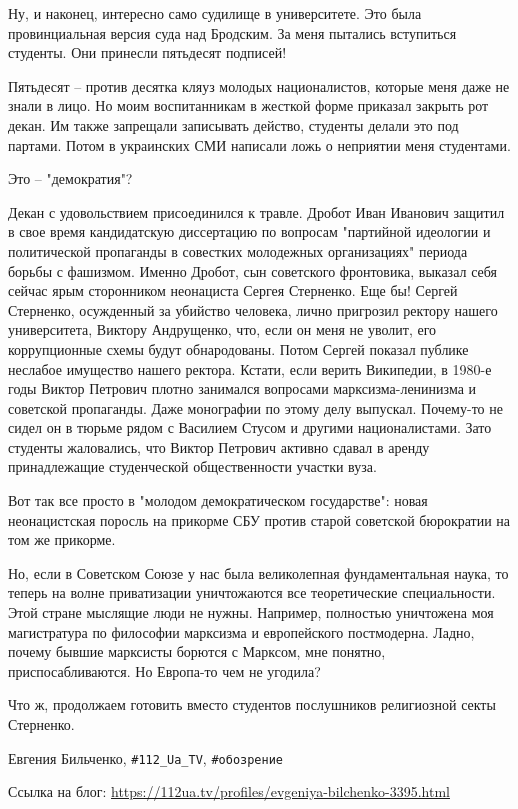 Ну, и наконец, интересно само судилище в университете. Это была провинциальная
версия суда над Бродским. За меня пытались вступиться студенты. Они принесли
пятьдесят подписей! 

Пятьдесят – против десятка кляуз молодых националистов, которые меня даже не
знали в лицо. Но моим воспитанникам в жесткой форме приказал закрыть рот декан.
Им также запрещали записывать действо, студенты делали это под партами. Потом в
украинских СМИ написали ложь о неприятии меня студентами.

Это – "демократия"?

Декан с удовольствием присоединился к травле. Дробот Иван Иванович защитил в
свое время кандидатскую диссертацию по вопросам "партийной идеологии и
политической пропаганды в совестких молодежных организациях" периода борьбы с
фашизмом. Именно Дробот, сын советского фронтовика, выказал себя сейчас ярым
сторонником неонациста Сергея Стерненко. Еще бы! Сергей Стерненко, осужденный
за убийство человека, лично пригрозил ректору нашего университета, Виктору
Андрущенко, что, если он меня не уволит, его коррупционные схемы будут
обнародованы. Потом Сергей показал публике неслабое имущество нашего ректора.
Кстати, если верить Википедии, в 1980-е годы Виктор Петрович плотно занимался
вопросами марксизма-ленинизма и советской пропаганды. Даже монографии по этому
делу выпускал. Почему-то не сидел он в тюрьме рядом с Василием Стусом и другими
националистами. Зато студенты жаловались, что Виктор Петрович активно сдавал в
аренду принадлежащие студенческой общественности участки вуза.

Вот так все просто в "молодом демократическом государстве": новая неонацистская
поросль на прикорме СБУ против старой советской бюрократии на том же прикорме.

Но, если в Советском Союзе у нас была великолепная фундаментальная наука, то
теперь на волне приватизации уничтожаются все теоретические специальности. Этой
стране мыслящие люди не нужны. Например, полностью уничтожена моя магистратура
по философии марксизма и европейского постмодерна. Ладно, почему бывшие
марксисты борются с Марксом, мне понятно, приспосабливаются. Но Европа-то чем
не угодила?

Что ж, продолжаем готовить вместо студентов послушников религиозной секты
Стерненко.

Евгения Бильченко, \verb|#112_Ua_TV|, \verb|#обозрение|

Ссылка на блог: \url{https://112ua.tv/profiles/evgeniya-bilchenko-3395.html}
